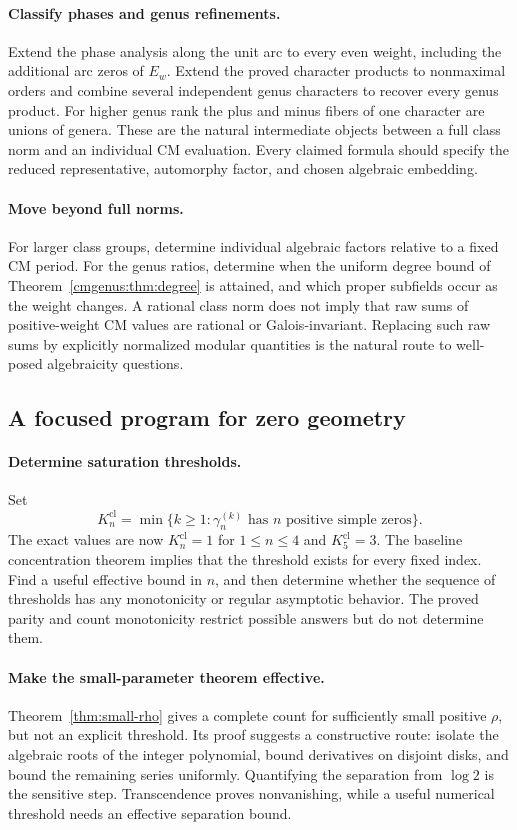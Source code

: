 \paragraph{Classify phases and genus refinements.}
Extend the phase analysis along the unit arc to every even weight,
including the additional arc zeros of $E_w$. Extend the proved character
products to nonmaximal orders and combine several independent genus
characters to recover every genus product. For higher genus rank the
plus and minus fibers of one character are unions of genera. These are the natural intermediate
objects between a full class norm and an individual CM evaluation.
Every claimed formula should specify the reduced representative,
automorphy factor, and chosen algebraic embedding.

\paragraph{Move beyond full norms.}
For larger class groups, determine individual algebraic factors relative
to a fixed CM period. For the genus ratios, determine when the uniform
degree bound of Theorem~\ref{cmgenus:thm:degree} is attained, and which
proper subfields occur as the weight changes. A rational class norm does not imply that raw sums of
positive-weight CM values are rational or Galois-invariant. Replacing
such raw sums by explicitly normalized modular quantities is the natural
route to well-posed algebraicity questions.

\subsection{A focused program for zero geometry}

\paragraph{Determine saturation thresholds.}
Set
\[
 K_n^{\mathrm{cl}}=\min\{k\ge1:\gamma_n^{(k)}
       \text{ has }n\text{ positive simple zeros}\}.
\]
The exact values are now $K_n^{\mathrm{cl}}=1$ for $1\le n\le4$ and
$K_5^{\mathrm{cl}}=3$. The baseline concentration theorem implies that
the threshold exists for every fixed index. Find a useful effective
bound in $n$, and then determine whether the sequence of thresholds has
any monotonicity or regular asymptotic behavior. The proved parity and
count monotonicity restrict possible answers but do not determine them.

\paragraph{Make the small-parameter theorem effective.}
Theorem~\ref{thm:small-rho} gives a complete count for sufficiently small
positive $\rho$, but not an explicit threshold. Its proof suggests a
constructive route: isolate the algebraic roots of the integer
polynomial, bound derivatives on disjoint disks, and bound the remaining
series uniformly. Quantifying the separation from $\log2$ is the
sensitive step. Transcendence proves nonvanishing, while a useful
numerical threshold needs an effective separation bound.

